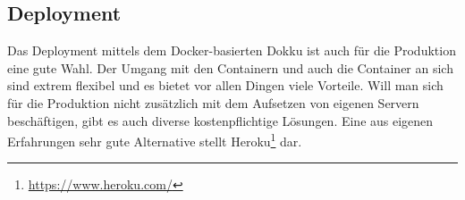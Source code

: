 \subsection{Deployment}

Das Deployment mittels dem Docker-basierten Dokku ist auch für die Produktion eine gute Wahl. Der Umgang mit den Containern und auch die Container an sich sind extrem flexibel und es bietet vor allen Dingen viele Vorteile. Will man sich für die Produktion nicht zusätzlich mit dem Aufsetzen von eigenen Servern beschäftigen, gibt es auch diverse kostenpflichtige Lösungen. Eine aus eigenen Erfahrungen sehr gute Alternative stellt Heroku\footnote{\url{https://www.heroku.com/}} dar.












